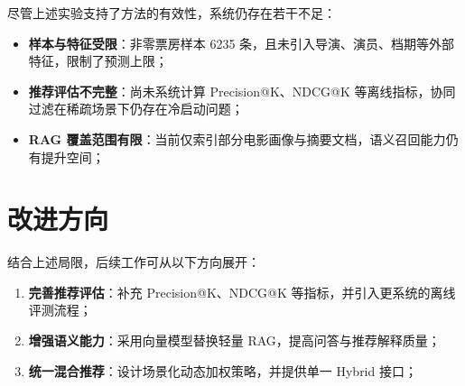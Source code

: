 尽管上述实验支持了方法的有效性，系统仍存在若干不足：

\begin{itemize}
    \item \textbf{样本与特征受限}：非零票房样本 6235 条，且未引入导演、演员、档期等外部特征，限制了预测上限；
    \item \textbf{推荐评估不完整}：尚未系统计算 Precision@K、NDCG@K 等离线指标，协同过滤在稀疏场景下仍存在冷启动问题；
    \item \textbf{RAG 覆盖范围有限}：当前仅索引部分电影画像与摘要文档，语义召回能力仍有提升空间；
\end{itemize}

\section{改进方向}
\label{sec:discussion:future}

结合上述局限，后续工作可从以下方向展开：

\begin{enumerate}
    \item \textbf{完善推荐评估}：补充 Precision@K、NDCG@K 等指标，并引入更系统的离线评测流程；
    \item \textbf{增强语义能力}：采用向量模型替换轻量 RAG，提高问答与推荐解释质量；
    \item \textbf{统一混合推荐}：设计场景化动态加权策略，并提供单一 Hybrid 接口；
\end{enumerate}
